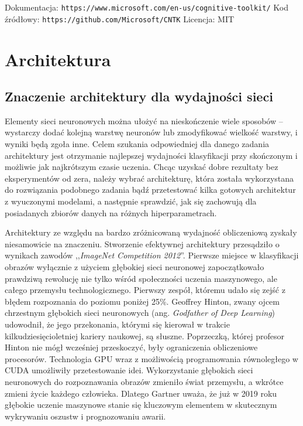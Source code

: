 \documentclass[12pt,a4paper,twoside,titlepage,openright]{book}
\begin{document}
\begin{itemize}
\begin{itemize}
\noindent
\newline
Dokumentacja: \texttt{https://www.microsoft.com/en-us/cognitive-toolkit/}
\newline
Kod źródłowy: \texttt{https://github.com/Microsoft/CNTK}
\newline
Licencja: MIT



\chapter{Architektura}
\section{Znaczenie architektury dla wydajności sieci}
Elementy sieci neuronowych można ułożyć na nieskończenie wiele sposobów -- wystarczy dodać kolejną warstwę neuronów lub zmodyfikować wielkość warstwy, i wyniki będą zgoła inne. Celem szukania odpowiedniej dla danego zadania architektury jest otrzymanie najlepszej wydajności klasyfikacji przy skończonym i możliwie jak najkrótszym czasie uczenia. Chcąc uzyskać dobre rezultaty bez eksperymentów od zera, należy wybrać architekturę, która została wykorzystana do rozwiązania podobnego zadania bądź przetestować kilka gotowych architektur z wyuczonymi modelami, a następnie sprawdzić, jak się zachowują dla posiadanych zbiorów danych na różnych hiperparametrach.

Architektury ze względu na bardzo zróżnicowaną wydajność obliczeniową zyskały niesamowicie na znaczeniu. Stworzenie efektywnej architektury przesądziło o wynikach zawodów ,,\textit{ImageNet Competition 2012}''. Pierwsze miejsce w klasyfikacji obrazów wyłącznie z użyciem głębokiej sieci neuronowej zapoczątkowało prawdziwą rewolucję nie tylko wśród społeczności uczenia maszynowego, ale całego przemysłu technologicznego. Pierwszy zespół, któremu udało się zejść z błędem rozpoznania do poziomu poniżej 25\%. Geoffrey Hinton, zwany ojcem chrzestnym głębokich sieci neuronowych (ang. \textit{Godfather of Deep Learning}) udowodnił, że jego przekonania, którymi się kierował w trakcie kilkudziesięcioletniej kariery naukowej, są słuszne. Poprzeczką, której profesor Hinton nie mógł wcześniej przeskoczyć, były ograniczenia obliczeniowe procesorów. Technologia GPU wraz z możliwością programowania równoległego w CUDA umożliwiły przetestowanie idei. Wykorzystanie głębokich sieci neuronowych do rozpoznawania obrazów zmieniło świat przemysłu, a wkrótce zmieni życie każdego człowieka. Dlatego Gartner uważa, że już w 2019 roku głębokie uczenie maszynowe stanie się kluczowym elementem w skutecznym wykrywaniu oszustw i prognozowaniu awarii.\cite{siteGartner2019}


\end{itemize}
\end{itemize}
\end{document}
